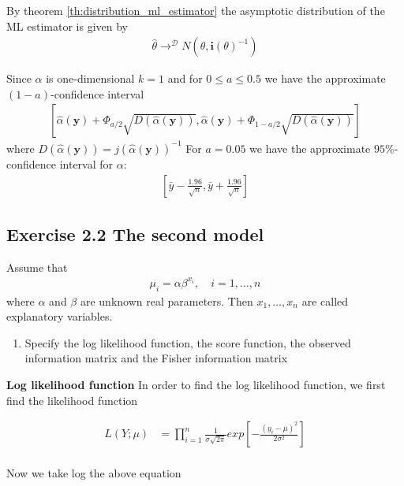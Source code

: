 By theorem \ref{th:distribution_ml_estimator} the asymptotic distribution of the ML estimator is given by
\begin{align*}
    \hat{\theta} \rightarrow^\mathcal{D} N\left( \theta, \boldsymbol{i}(\theta)^{-1} \right)
\end{align*}

Since $\alpha$ is one-dimensional $k=1$ and for $0\leq a \leq 0.5$ we have the approximate $(1-a)$-confidence interval
\begin{align*}
\left[ \hat{\alpha}(\mathbf{y}) + \Phi_{a/2} \sqrt{D\left( \hat{\alpha}\left(\mathbf{y}\right)\right)}, \hat{\alpha}(\mathbf{y}) + \Phi_{1 - a/2} \sqrt{D\left( \hat{\alpha}\left(\mathbf{y}\right)\right)} \right]
\end{align*}
where $D\left(\hat{\alpha}(\mathbf{y})\right) = j\left(\hat{\alpha}(\mathbf{y})\right)^{-1}$
For $a=0.05$ we have the approximate $95\%$-confidence interval for $\alpha$:
\begin{align*}
\left[ \bar{y} - \frac{1.96}{\sqrt{n}}, \bar{y} + \frac{1.96}{\sqrt{n}} \right]    
\end{align*}

\subsection*{Exercise 2.2 The second model}

Assume that
\begin{align*}
    \mu_i=\alpha \beta^{x_i}, \quad i=1,\ldots, n
\end{align*}
where $\alpha$ and $\beta$ are unknown real parameters. Then $x_1, \ldots,x_n$ are called explanatory variables. 

\begin{enumerate}
    \item Specify the log likelihood function, the score function, the observed information matrix and the Fisher information matrix
\end{enumerate}

\textbf{Log likelihood function}
In order to find the log likelihood function, we first find the likelihood function

\begin{align*}
   L(Y;\mu) &= \prod_{i=1}^n \frac{1}{\sigma \sqrt{2 \pi}}exp\left[-\frac{(y_i -\mu)^2}{2 \sigma^2}\right]\\
\end{align*}

Now we take log the above equation

